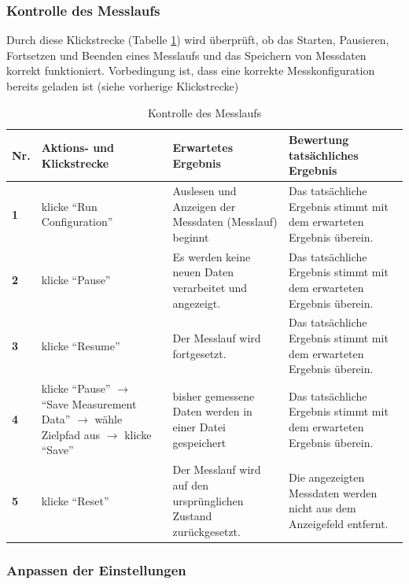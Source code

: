 \documentclass[parskip=full]{scrartcl}
\begin{document}
\subsubsection{Kontrolle des Messlaufs}

Durch diese Klickstrecke (Tabelle \ref{klickMesslauf}) wird überprüft, ob das Starten, Pausieren, Fortsetzen und Beenden eines Messlaufs und das Speichern von Messdaten korrekt funktioniert. Vorbedingung ist, dass eine korrekte Messkonfiguration bereits geladen ist (siehe vorherige Klickstrecke)

\begin{table}[h]
\begin{tabular}{| p{} | p{} | p{} | p{} |}
	\hline
	\textbf{Nr.} & \textbf{Aktions- und Klickstrecke} & \textbf{Erwartetes Ergebnis}  & \textbf{ Bewertung tatsächliches Ergebnis} \\ \hline
	\textbf{1}
	& 
	klicke ``Run Configuration''
	&
	Auslesen und Anzeigen der Messdaten (Messlauf) beginnt
	& 
	Das tatsächliche Ergebnis stimmt mit dem erwarteten Ergebnis überein.
	\\ \hline
	
	\textbf{2}
	& 
	klicke ``Pause''
	&
	Es werden keine neuen Daten verarbeitet und angezeigt.
	& 
	Das tatsächliche Ergebnis stimmt mit dem erwarteten Ergebnis überein.
	\\ \hline
	
	\textbf{3}
	& 
	klicke ``Resume''
	&
	Der Messlauf wird fortgesetzt.
	& 
	Das tatsächliche Ergebnis stimmt mit dem erwarteten Ergebnis überein.
	\\ \hline
	
	\textbf{4}
	& 
	klicke ``Pause'' $\rightarrow$ ``Save Measurement Data'' $\rightarrow$ wähle Zielpfad aus $\rightarrow$ klicke ``Save''
	&
	bisher gemessene Daten werden in einer Datei gespeichert
	& 
	Das tatsächliche Ergebnis stimmt mit dem erwarteten Ergebnis überein.
	\\ \hline
	
	\textbf{5}
	& 
	klicke ``Reset''
	&
	Der Messlauf wird auf den ursprünglichen Zustand zurückgesetzt.
	& 
	Die angezeigten Messdaten werden nicht aus dem Anzeigefeld entfernt.
	\\ \hline
	
\end{tabular}

\caption{Kontrolle des Messlaufs}
\label{klickMesslauf}
\end{table}


\subsubsection{Anpassen der Einstellungen}
\end{document}
